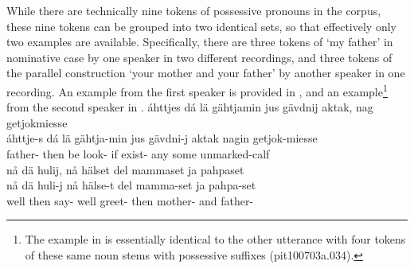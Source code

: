 While there are technically nine tokens of possessive pronouns in the corpus, these nine tokens can be grouped into two identical sets, so that effectively only two examples are available. Specifically, there are three tokens of  ‘my father’ in nominative case by one speaker in two different recordings, and three tokens of the parallel construction  ‘your mother and your father’ by another speaker in one recording. An example from the first speaker is provided in , and an example\footnote{The example in  is essentially identical to the other utterance with four tokens of these same noun stems with possessive suffixes (pit100703a.034).} 
from the second speaker in .
\ea\label{possSuffix1}%
\glll	áhttjes dá lä gähtjamin jus gävdnij aktak, nag getjokmiesse\\
	áhttje-s dá lä gähtja-min jus gävdni-j aktak nagin getjok-miesse\\
	father- then be\BS{} look- if exist- any some unmarked-calf\BS{}\\%
	
\z
\ea\label{possSuffix5}
\glll	nå dä hulij, nå hälset del mammaset ja pahpaset\\
	nå dä huli-j nå hälse-t del mamma-set ja pahpa-set\\
	well then say- well greet- then mother- and father- \\\nopagebreak
{}	
\z

